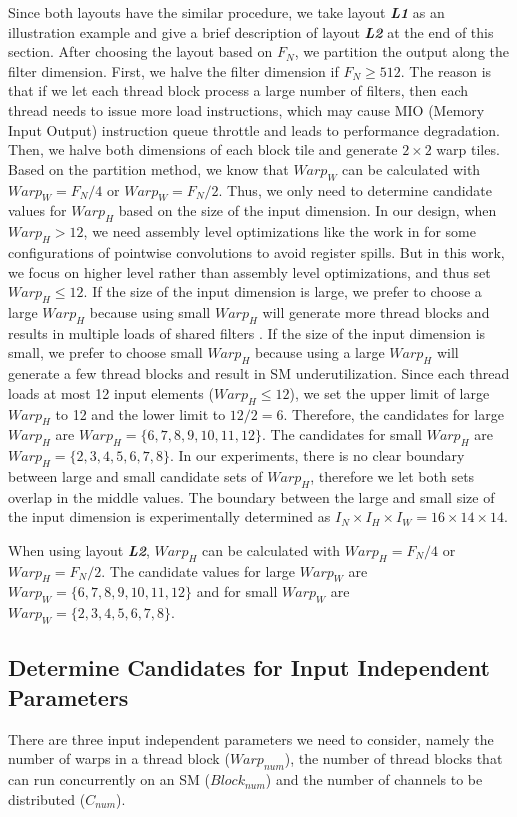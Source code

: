 Since both layouts have the similar procedure, we take layout \textbf{\emph{L1}} as an illustration example and give a brief description of layout \textbf{\emph{L2}} at the end of this section.
After choosing the layout based on $F_N$, we partition the output along the filter dimension.
First, we halve the filter dimension if $F_N \geq 512$.
The reason is that if we let each thread block process a large number of filters, then each thread needs to issue more load instructions, which may cause MIO (Memory Input Output) instruction queue throttle and leads to performance degradation.
Then, we halve both dimensions of each block tile and generate $2 \times 2$ warp tiles.
Based on the partition method, we know that $Warp_W$ can be calculated with $Warp_W=F_N/4$ or $Warp_W=F_N/2$. Thus, we only need to determine candidate values for $Warp_H$ based on the size of the input dimension.
In our design, when $Warp_H > 12$, we need assembly level optimizations like the work in
\cite{yan2020optimizing,yan2020demystifying} for some configurations of pointwise convolutions to avoid register spills. But in this work,
we focus on higher level rather than assembly level optimizations, and thus set $Warp_H \leq 12$.
If the size of the input dimension is large, we prefer to choose a large $Warp_H$ because using small $Warp_H$ will generate more thread blocks and results in multiple loads of shared filters \cite{jia2020enabling, zheng2020flextensor}.
If the size of the input dimension is small, we prefer to choose small $Warp_H$ because using a large $Warp_H$ will generate a few thread blocks and result in SM underutilization.
Since each thread loads at most 12 input elements ($Warp_H \leq 12$), we set the upper limit of large $Warp_H$ to 12 and the lower limit to $12/2=6$.
Therefore, the candidates for large $Warp_H$ are $Warp_H=\{6,7,8,9,10,11,12\}$.
The candidates for small $Warp_H$ are $Warp_H=\{2,3,4,5,6,7,8\}$.
In our experiments, there is no clear boundary between large and small candidate sets of $Warp_H$, therefore we let both sets overlap in the middle values.
The boundary between the large and small size of the input dimension is experimentally determined as $I_N \times I_H \times I_W=16 \times 14 \times 14$.

When using layout \textbf{\emph{L2}}, $Warp_H$ can be calculated with $Warp_H=F_N/4$ or $Warp_H=F_N/2$. The candidate values for large $Warp_W$ are $Warp_W=\{6,7,8,9,10,11,12\}$ and for small $Warp_W$ are $Warp_W=\{2,3,4,5,6,7,8\}$.

\subsection{Determine Candidates for Input Independent Parameters}
There are three input independent parameters we need to consider, namely the number of warps in a thread block ($Warp_{num}$), the number of thread blocks that can run concurrently on an SM ($Block_{num}$) and the number of channels to be distributed ($C_{num}$).

